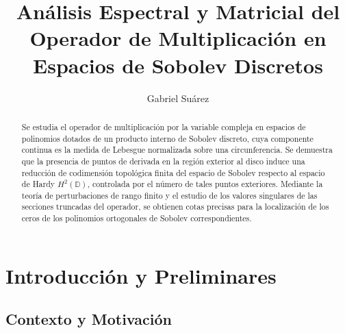 \documentclass[12pt,a4paper]{article}
\theoremstyle{definition}
\theoremstyle{remark}
\begin{document}
\title{Análisis Espectral y Matricial del Operador de Multiplicación en Espacios de Sobolev Discretos}
\author{Gabriel Suárez}
\maketitle


\begin{abstract}
	Se estudia el operador de multiplicación por la variable compleja en espacios de polinomios dotados de un producto interno de Sobolev discreto, cuya componente continua es la medida de Lebesgue normalizada sobre una circunferencia. Se demuestra que la presencia de puntos de derivada en la región exterior al disco induce una reducción de codimensión topológica finita del espacio de Sobolev respecto al espacio de Hardy $H^2(\mathbb{D})$, controlada por el número de tales puntos exteriores. Mediante la teoría de perturbaciones de rango finito y el estudio de los valores singulares de las secciones truncadas del operador, se obtienen cotas precisas para la localización de los ceros de los polinomios ortogonales de Sobolev correspondientes.
\end{abstract}

\newpage
\tableofcontents
\newpage

\section{Introducción y Preliminares}\label{sec:intro}

\subsection{Contexto y Motivación}
\end{document}
